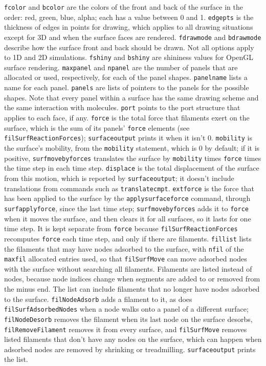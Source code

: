 \documentclass {scrbook}
\newcommand {\ttt} {\texttt}
\begin{document}
\ttt{fcolor} and \ttt{bcolor} are the colors of the front and back of the surface in the order: red, green, blue, alpha; each has a value between 0 and 1. \ttt{edgepts} is the thickness of edges in points for drawing, which applies to all drawing situations except for 3D and when the surface faces are rendered. \ttt{fdrawmode} and \ttt{bdrawmode} describe how the surface front and back should be drawn. Not all options apply to 1D and 2D simulations. \ttt{fshiny} and \ttt{bshiny} are shininess values for OpenGL surface rendering. \ttt{maxpanel} and \ttt{npanel} are the number of panels that are allocated or used, respectively, for each of the panel shapes. \ttt{panelname} lists a name for each panel. \ttt{panels} are lists of pointers to the panels for the possible shapes. Note that every panel within a surface has the same drawing scheme and the same interaction with molecules. \ttt{port} points to the port structure that applies to each face, if any. \ttt{force} is the total force that filaments exert on the surface, which is the sum of its panels' \ttt{force} elements (see \ttt{filSurfReactionForces}); \ttt{surfaceoutput} prints it when it isn't 0. \ttt{mobility} is the surface's mobility, from the \ttt{mobility} statement, which is 0 by default; if it is positive, \ttt{surfmovebyforces} translates the surface by \ttt{mobility} times \ttt{force} times the time step in each time step. \ttt{displace} is the total displacement of the surface from this motion, which is reported by \ttt{surfaceoutput}; it doesn't include translations from commands such as \ttt{translatecmpt}. \ttt{extforce} is the force that has been applied to the surface by the \ttt{applysurfaceforce} command, through \ttt{surfapplyforce}, since the last time step; \ttt{surfmovebyforces} adds it to \ttt{force} when it moves the surface, and then clears it for all surfaces, so it lasts for one time step. It is kept separate from \ttt{force} because \ttt{filSurfReactionForces} recomputes \ttt{force} each time step, and only if there are filaments. \ttt{fillist} lists the filaments that may have nodes adsorbed to the surface, with \ttt{nfil} of the \ttt{maxfil} allocated entries used, so that \ttt{filSurfMove} can move adsorbed nodes with the surface without searching all filaments. Filaments are listed instead of nodes, because node indices change when segments are added to or removed from the minus end. The list can include filaments that no longer have nodes adsorbed to the surface. \ttt{filNodeAdsorb} adds a filament to it, as does \ttt{filSurfAdsorbedNodes} when a node walks onto a panel of a different surface; \ttt{filNodeDesorb} removes the filament when its last node on the surface desorbs, \ttt{filRemoveFilament} removes it from every surface, and \ttt{filSurfMove} removes listed filaments that don't have any nodes on the surface, which can happen when adsorbed nodes are removed by shrinking or treadmilling. \ttt{surfaceoutput} prints the list.
\end{document}
